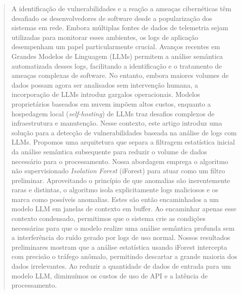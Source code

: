 \documentclass[sigconf, anonymous]{acmart}
\begin{document}
\begin{abstract}
A identificação de vulnerabilidades e a reação a ameaças cibernéticas têm desafiado os desenvolvedores de software desde a popularização dos sistemas em rede. Embora múltiplas fontes de dados de telemetria sejam utilizadas para monitorar esses ambientes, os logs de aplicação desempenham um papel particularmente crucial. Avanços recentes em Grandes Modelos de Linguagem (LLMs) permitem a análise semântica automatizada desses logs, facilitando a identificação e o tratamento de ameaças complexas de software. No entanto, embora maiores volumes de dados possam agora ser analisados sem intervenção humana, a incorporação de LLMs introduz gargalos operacionais. Modelos proprietários baseados em nuvem impõem altos custos, enquanto a hospedagem local (\textit{self-hosting}) de LLMs traz desafios complexos de infraestrutura e manutenção. Nesse contexto, este artigo introduz uma solução para a detecção de vulnerabilidades baseada na análise de logs com LLMs. Propomos uma arquitetura que separa a filtragem estatística inicial da análise semântica subsequente para reduzir o volume de dados necessário para o processamento. Nossa abordagem emprega o algoritmo não supervisionado \textit{Isolation Forest} (iForest) para atuar como um filtro preliminar. Aproveitando o princípio de que anomalias são inerentemente raras e distintas, o algoritmo isola explicitamente logs maliciosos e os marca como possíveis anomalias. Estes são então encaminhados a um modelo LLM em janelas de contexto em buffer. Ao encaminhar apenas esse contexto condensado, permitimos que o sistema crie as condições necessárias para que o modelo realize uma análise semântica profunda sem a interferência do ruído gerado por logs de uso normal. Nossos resultados preliminares mostram que a análise estatística usando iForest intercepta com precisão o tráfego anômalo, permitindo descartar a grande maioria dos dados irrelevantes. Ao reduzir a quantidade de dados de entrada para um modelo LLM, diminuímos os custos de uso de API e a latência de processamento.

\vspace{1em}


\end{abstract}
\end{document}

